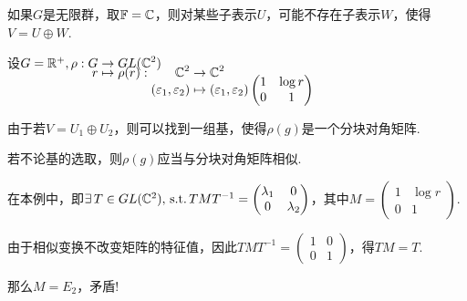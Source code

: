 如果$G$是无限群，取$\mathbb{F}=\mathbb{C}$，则对某些子表示$U$，可能不存在子表示$W$，使得$V=U\oplus W$.
\begin{instance}
    设$G=\mb{R}^+,\setjot[-6]\begin{aligned}[t]
        \rho:G&\to GL(\mb{C}^2) \\
        r&\mapsto \rho(r):\setjot[-4]\begin{aligned}[t]
            \mb{C}^2&\to \mb{C}^2 \\
            (\varepsilon_1,\varepsilon_2)&\mapsto(\varepsilon_1,\varepsilon_2)\begin{pmatrix}
                1 & \log r \\
                0 & 1
            \end{pmatrix}
        \end{aligned}
    \end{aligned}$\par
    由于若$V=U_1\oplus U_2$，则可以找到一组基，使得$\rho(g)$是一个分块对角矩阵.\par
    若不论基的选取，则$\rho(g)$应当与分块对角矩阵相似.\par
    在本例中，即$\exists\, T\in GL(\mathbb{C}^2),\operatorname{\,\text{s.t.}} TMT^{-1}=\begin{pmatrix}
    \lambda_1 & 0\\
    0 & \lambda_2 
    \end{pmatrix}$，其中$M=\begin{pmatrix}
        1 & \log r \\
        0 & 1
    \end{pmatrix}$.\par
    由于相似变换不改变矩阵的特征值，因此$TMT^{-1}=\begin{pmatrix}
    1 & 0 \\
    0 & 1
    \end{pmatrix}$，得$TM=T$.\par
    那么$M=E_2$，矛盾!
\end{instance}


